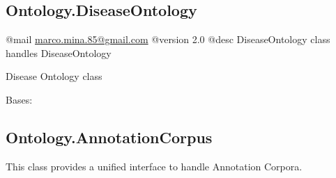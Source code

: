 \documentclass[letterpaper,10pt,english]{sphinxmanual}
\begin{document}
\subsection{Ontology.DiseaseOntology}
\label{fastsemsim.Ontology:ontology-diseaseontology}\label{fastsemsim.Ontology:module-fastsemsim.Ontology.DiseaseOntology}
@mail \href{mailto:marco.mina.85@gmail.com}{marco.mina.85@gmail.com}
@version 2.0
@desc DiseaseOntology class handles DiseaseOntology

Disease Ontology class

\begin{fulllineitems}
\label{fastsemsim.Ontology:fastsemsim.Ontology.DiseaseOntology.DiseaseOntology}
Bases: {\hyperref[fastsemsim.Ontology:fastsemsim.Ontology.Ontology.Ontology]{}}

\begin{fulllineitems}
\label{fastsemsim.Ontology:fastsemsim.Ontology.DiseaseOntology.DiseaseOntology.alt_ids}
\end{fulllineitems}


\begin{fulllineitems}
\label{fastsemsim.Ontology:fastsemsim.Ontology.DiseaseOntology.DiseaseOntology.obsolete_ids}
\end{fulllineitems}


\end{fulllineitems}



\subsection{Ontology.AnnotationCorpus}
\label{fastsemsim.Ontology:module-fastsemsim.Ontology.AnnotationCorpus}\label{fastsemsim.Ontology:ontology-annotationcorpus}
This class provides a unified interface to handle Annotation Corpora.
\end{document}
